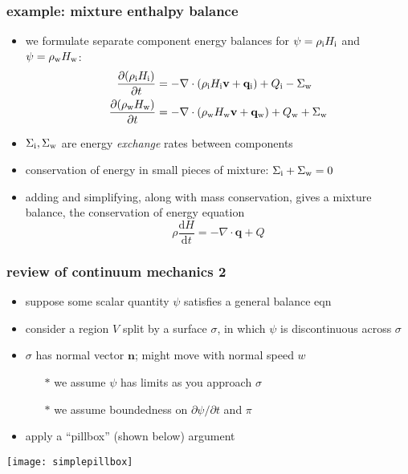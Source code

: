 \documentclass{beamer}
\newcommand{\bv}{\mathbf{v}}
\begin{document}
\begin{frame}
  \frametitle{example: mixture enthalpy balance}

\begin{itemize}
\item we formulate separate component energy balances for $\psi=\rho_{\text i} H_{\text i}$ and $\psi = \rho_{\text w} H_{\text w}$:
\scriptsize
\begin{align*}
  \frac{\partial (\rho_{\text i} H_{\text i})}{\partial t} &= - \nabla \cdot \left(\rho_{\text i} H_{\text i} \bv + \mathbf{q}_{\text i}\right) + Q_{\text i} - \Sigma_{\text w} \\
  \frac{\partial (\rho_{\text w} H_{\text w})}{\partial t} &= - \nabla \cdot \left(\rho_{\text w} H_{\text w} \bv + \mathbf{q}_{\text w}\right) + Q_{\text w} + \Sigma_{\text w}
\end{align*}
\normalsize
\item $\Sigma_{\text i},\Sigma_{\text w}$ are energy \emph{exchange} rates between components
\item conservation of energy in small pieces of mixture: $\Sigma_{\text i}+\Sigma_{\text w}=0$
\item adding and simplifying, along with mass conservation, gives a mixture balance, the \alert{conservation of energy equation}
    $$\rho \frac{\text{d} H}{\text{d}t}  = - \nabla \cdot \mathbf{q} + Q$$
\end{itemize}
\end{frame}


\begin{frame}
  \frametitle{review of continuum mechanics 2}

\begin{itemize}
\item suppose some scalar quantity $\psi$ satisfies a general balance eqn
\item consider a region $V$ split by a surface $\sigma$, in which $\psi$ is discontinuous across $\sigma$
\item $\sigma$ has normal vector $\mathbf{n}$; might move with normal speed $w$
  \begin{itemize}
  \item[$\ast$] we assume $\psi$ has limits as you approach $\sigma$
  \item[$\ast$] we assume boundedness on $\partial\psi/\partial t$ and $\pi$
  \end{itemize}
\item apply a ``pillbox'' (shown below) argument
\end{itemize}

  \begin{center}
    \texttt{[image: simplepillbox]}
  \end{center}
\end{frame}
\end{document}
